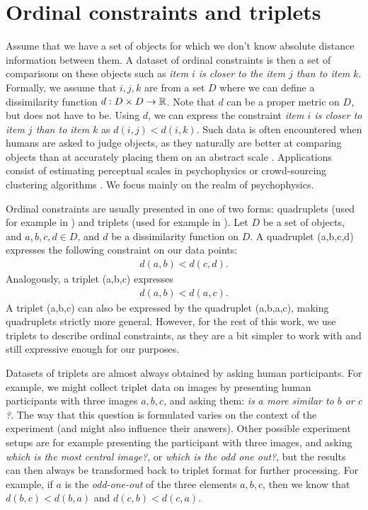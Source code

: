 \section{Ordinal constraints and triplets}
Assume that we have a set of objects for which we don't know absolute distance information
between them. 
A dataset of ordinal constraints is then a set of comparisons on these
objects such as \textit{item $i$ is closer to the item $j$ than to item $k$}. 
Formally, we assume that $i, j, k$ are from 
a set $D$ where we can define a dissimilarity function $d: D \times D \to \mathbb{R}$. Note that $d$ can be a proper metric on $D$, but does not have to be.
Using $d$, we can express the constraint \textit{item $i$ is closer to item $j$ than to item $k$} 
as $d(i, j) < d(i, k)$. Such data is often encountered when humans are asked to judge objects, 
as they naturally are better at comparing objects
than at accurately placing them on an abstract scale \citep{demiralpLearningPerceptualKernels2014}. 
Applications consist of estimating perceptual scales in psychophysics 
\citep{haghiriEstimationPerceptualScales2020} or crowd-sourcing clustering algorithms \citep{ukkonenCrowdsourcedCorrelationClustering2017}. 
We focus mainly on the realm of psychophysics.

Ordinal constraints are usually presented in one of two forms: quadruplets (used for example in \cite{ghoshdastidarFoundationsComparisonBasedHierarchical2019}) and triplets (used for example in \cite{vankadaraInsightsOrdinalEmbedding2021,haghiriComparisonBasedFrameworkPsychophysics2019}).
Let $D$ be a set of objects, and $a,b,c,d \in D$, and $d$ be a dissimilarity function on $D$.
A quadruplet (a,b,c,d) expresses the following constraint on our data points: 
\begin{align}
d(a,b) < d(c,d)
.\end{align}
Analogously, a triplet (a,b,c) expresses 
\begin{align}
d(a,b) < d(a,c) 
.\end{align}
A triplet (a,b,c) can also be expressed by the quadruplet (a,b,a,c), making quadruplets strictly more general. 
However, for the rest of this work, we use triplets to describe ordinal constraints, as they are a bit simpler to work with and still expressive enough for our purposes.

Datasets of triplets are almost always obtained by asking human participants. For example, we might 
collect triplet data on images by presenting human participants with three images $a,b,c$, 
and asking them: \textit{is $a$ more similar to $b$ or $c$?}.
The way that this question is formulated varies on the context of the experiment (and might also influence their answers). 
Other possible experiment setups are for example presenting the participant with three images, and asking \textit{which is the most central image?}, or \textit{which is the odd one out?},
but the results can then always be transformed back to triplet format for further processing. 
For example, if $a$ is the \textit{odd-one-out} of the three elements $a,b,c$, 
then we know that $d(b,c) < d(b,a)$ and $d(c, b) < d(c,a)$. 

